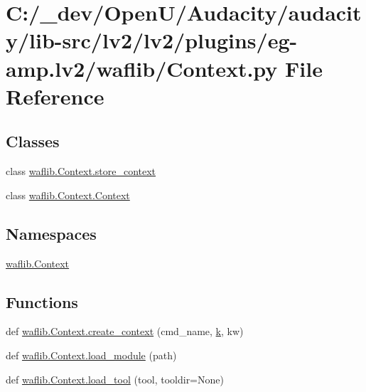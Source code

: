 \hypertarget{lv2_2plugins_2eg-amp_8lv2_2waflib_2_context_8py}{}\section{C\+:/\+\_\+dev/\+Open\+U/\+Audacity/audacity/lib-\/src/lv2/lv2/plugins/eg-\/amp.lv2/waflib/\+Context.py File Reference}
\label{lv2_2plugins_2eg-amp_8lv2_2waflib_2_context_8py}
\subsection*{Classes}
\begin{DoxyCompactItemize}
\item 
class \hyperlink{classwaflib_1_1_context_1_1store__context}{waflib.\+Context.\+store\+\_\+context}
\item 
class \hyperlink{classwaflib_1_1_context_1_1_context}{waflib.\+Context.\+Context}
\end{DoxyCompactItemize}
\subsection*{Namespaces}
\begin{DoxyCompactItemize}
\item 
 \hyperlink{namespacewaflib_1_1_context}{waflib.\+Context}
\end{DoxyCompactItemize}
\subsection*{Functions}
\begin{DoxyCompactItemize}
\item 
def \hyperlink{namespacewaflib_1_1_context_a224d64e5e44f9aae4903dc52235d6470}{waflib.\+Context.\+create\+\_\+context} (cmd\+\_\+name, \hyperlink{rfft2d_test_m_l_8m_adc468c70fb574ebd07287b38d0d0676d}{k}, kw)
\item 
def \hyperlink{namespacewaflib_1_1_context_ae0923656ff2aebede696050061d6d48d}{waflib.\+Context.\+load\+\_\+module} (path)
\item 
def \hyperlink{namespacewaflib_1_1_context_a2f9fe1693a40a8fa972154b9eeec3424}{waflib.\+Context.\+load\+\_\+tool} (tool, tooldir=None)
\end{DoxyCompactItemize}
